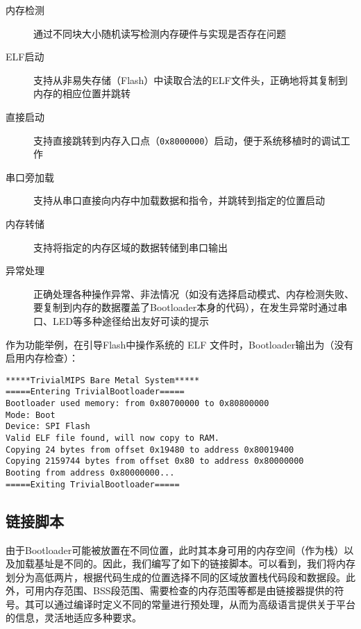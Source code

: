 \begin{description}
    \item[内存检测] 通过不同块大小随机读写检测内存硬件与实现是否存在问题
    \item[ELF启动] 支持从非易失存储（Flash）中读取合法的ELF文件头，正确地将其复制到内存的相应位置并跳转
    \item[直接启动] 支持直接跳转到内存入口点（\texttt{0x8000000}）启动，便于系统移植时的调试工作
    \item[串口旁加载] 支持从串口直接向内存中加载数据和指令，并跳转到指定的位置启动
    \item[内存转储] 支持将指定的内存区域的数据转储到串口输出
    \item[异常处理] 正确处理各种操作异常、非法情况（如没有选择启动模式、内存检测失败、要复制到内存的数据覆盖了Bootloader本身的代码），在发生异常时通过串口、LED等多种途径给出友好可读的提示
\end{description}

作为功能举例，在引导Flash中操作系统的 ELF 文件时，Bootloader输出为（没有启用内存检查）：
\begin{verbatim}
*****TrivialMIPS Bare Metal System*****
=====Entering TrivialBootloader=====
Bootloader used memory: from 0x80700000 to 0x80800000
Mode: Boot
Device: SPI Flash
Valid ELF file found, will now copy to RAM.
Copying 24 bytes from offset 0x19480 to address 0x80019400
Copying 2159744 bytes from offset 0x80 to address 0x80000000
Booting from address 0x80000000...
=====Exiting TrivialBootloader=====
\end{verbatim}

\subsection{链接脚本}

由于Bootloader可能被放置在不同位置，此时其本身可用的内存空间（作为栈）以及加载基址是不同的。因此，我们编写了如下的链接脚本。可以看到，我们将内存划分为高低两片，根据代码生成的位置选择不同的区域放置栈代码段和数据段。此外，可用内存范围、BSS段范围、需要检查的内存范围等都是由链接器提供的符号。其可以通过编译时定义不同的常量进行预处理，从而为高级语言提供关于平台的信息，灵活地适应多种要求。


